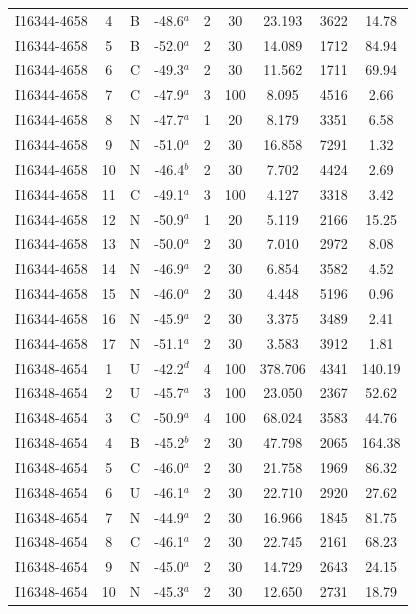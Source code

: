 \begin{table}
\begin{tabular}{ccccccccc}
I16344-4658 & 4 & B & -48.6$^{a}$ & 2 & 30 & 23.193 & 3622 & 14.78 \\
I16344-4658 & 5 & B & -52.0$^{a}$ & 2 & 30 & 14.089 & 1712 & 84.94 \\
I16344-4658 & 6 & C & -49.3$^{a}$ & 2 & 30 & 11.562 & 1711 & 69.94 \\
I16344-4658 & 7 & C & -47.9$^{a}$ & 3 & 100 & 8.095 & 4516 & 2.66 \\
I16344-4658 & 8 & N & -47.7$^{a}$ & 1 & 20 & 8.179 & 3351 & 6.58 \\
I16344-4658 & 9 & N & -51.0$^{a}$ & 2 & 30 & 16.858 & 7291 & 1.32 \\
I16344-4658 & 10 & N & -46.4$^{b}$ & 2 & 30 & 7.702 & 4424 & 2.69 \\
I16344-4658 & 11 & C & -49.1$^{a}$ & 3 & 100 & 4.127 & 3318 & 3.42 \\
I16344-4658 & 12 & N & -50.9$^{a}$ & 1 & 20 & 5.119 & 2166 & 15.25 \\
I16344-4658 & 13 & N & -50.0$^{a}$ & 2 & 30 & 7.010 & 2972 & 8.08 \\
I16344-4658 & 14 & N & -46.9$^{a}$ & 2 & 30 & 6.854 & 3582 & 4.52 \\
I16344-4658 & 15 & N & -46.0$^{a}$ & 2 & 30 & 4.448 & 5196 & 0.96 \\
I16344-4658 & 16 & N & -45.9$^{a}$ & 2 & 30 & 3.375 & 3489 & 2.41 \\
I16344-4658 & 17 & N & -51.1$^{a}$ & 2 & 30 & 3.583 & 3912 & 1.81 \\
I16348-4654 & 1 & U & -42.2$^{d}$ & 4 & 100 & 378.706 & 4341 & 140.19 \\
I16348-4654 & 2 & U & -45.7$^{a}$ & 3 & 100 & 23.050 & 2367 & 52.62 \\
I16348-4654 & 3 & C & -50.9$^{a}$ & 4 & 100 & 68.024 & 3583 & 44.76 \\
I16348-4654 & 4 & B & -45.2$^{b}$ & 2 & 30 & 47.798 & 2065 & 164.38 \\
I16348-4654 & 5 & C & -46.0$^{a}$ & 2 & 30 & 21.758 & 1969 & 86.32 \\
I16348-4654 & 6 & U & -46.1$^{a}$ & 2 & 30 & 22.710 & 2920 & 27.62 \\
I16348-4654 & 7 & N & -44.9$^{a}$ & 2 & 30 & 16.966 & 1845 & 81.75 \\
I16348-4654 & 8 & C & -46.1$^{a}$ & 2 & 30 & 22.745 & 2161 & 68.23 \\
I16348-4654 & 9 & N & -45.0$^{a}$ & 2 & 30 & 14.729 & 2643 & 24.15 \\
I16348-4654 & 10 & N & -45.3$^{a}$ & 2 & 30 & 12.650 & 2731 & 18.79 \\

\end{tabular}
\end{table}
